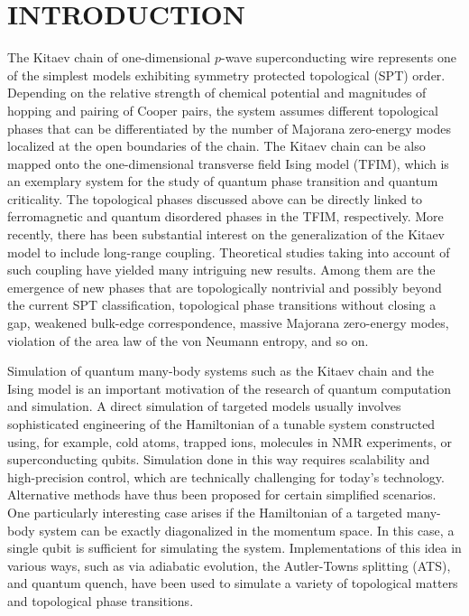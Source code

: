 \documentclass[aps,reprint,groupedaddress,showpacs,superscriptaddress]{revtex4-1}
\begin{document}
\section{INTRODUCTION}

The Kitaev chain of one-dimensional $p$-wave superconducting wire represents one of the simplest models exhibiting symmetry protected topological (SPT) order\cite{Kitaev_2001,ATI_book,Ozawa2019}. Depending on the relative strength of chemical potential and magnitudes of hopping and pairing of Cooper pairs, the system assumes different topological phases that can be differentiated by the number of Majorana zero-energy modes localized at the open boundaries of the chain\cite{Read2000,Alicea2012}. The Kitaev chain can be also mapped onto the one-dimensional transverse field Ising model (TFIM), which is an exemplary system for the study of quantum phase transition and quantum criticality\cite{Kopp2005,Niu2012,Zhang2015}. The topological phases discussed above can be directly linked to ferromagnetic and quantum disordered phases in the TFIM, respectively. More recently, there has been substantial interest on the generalization of the Kitaev model to include long-range coupling\cite{Kopp2005,Niu2012,DeGottardi2013,Pientka2013,Vodola2014,Ghazaryan2015,Vodola2015,Zhang2015,Shi2017,Pientka2015,Viyuela_2016,Lepori2017,Patrick2017,Alecce2017,Zazunov2017}. Theoretical studies taking into account of such coupling have yielded many intriguing new results. Among them are the emergence of new phases that are topologically nontrivial and possibly beyond the current SPT classification\cite{Niu2012,Lepori2017}, topological phase transitions without closing a gap\cite{Vodola2014}, weakened bulk-edge correspondence\cite{Lepori2017}, massive Majorana zero-energy modes\cite{Viyuela_2016,Alecce2017}, violation of the area law of the von Neumann entropy\cite{Vodola2014,Lepori2017}, and so on.     

Simulation of quantum many-body systems such as the Kitaev chain and the Ising model is an important motivation of the research of quantum computation and simulation. A direct simulation of targeted models usually involves sophisticated engineering of the Hamiltonian of a tunable system constructed using, for example, cold atoms\cite{cold_Trenkwalder2016}, trapped ions\cite{ion_Islam2011,ion_Kim2010,Gerritsma2010,Friedenauer2008}, molecules in NMR experiments\cite{Zhang2008}, or superconducting qubits\cite{Roushan2016,Roushan2017,Xu2018,Wang2019}. Simulation done in this way requires scalability and high-precision control, which are technically challenging for today's technology. Alternative methods have thus been proposed for certain simplified scenarios. One particularly interesting case arises if the Hamiltonian of a targeted many-body system can be exactly diagonalized in the momentum space. In this case, a single qubit is sufficient for simulating the system. Implementations of this idea in various ways, such as via adiabatic evolution, the Autler-Towns splitting (ATS), and quantum quench, have been used to simulate a variety of topological matters and topological phase transitions\cite{Roushan2014,Tan2017,Tan_2018,Tan2019,adia_Schroer_2014,nv_Ma2018,Yang_arxiv2019,Wang_arxiv_2019}. 
\end{document}
